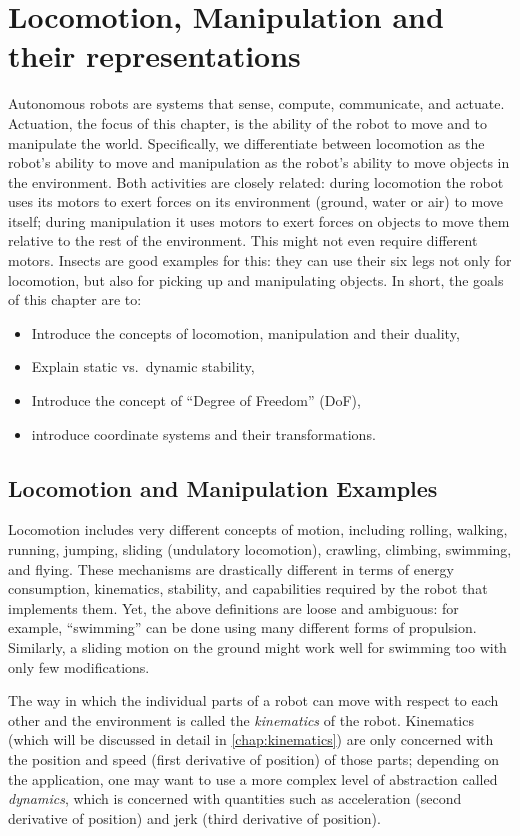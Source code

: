 \chapter{Locomotion, Manipulation and their representations}\label{chap:locomotion}

Autonomous robots are systems that sense, compute, communicate, and actuate. Actuation, the focus of this chapter, is the ability of the robot to move and to manipulate the world. Specifically, we differentiate between locomotion as the robot's ability to move and manipulation as the robot's ability to move objects in the environment. Both activities are closely related: during locomotion the robot uses its motors to exert forces on its environment (ground, water or air) to move itself; during manipulation it uses motors to exert forces on objects to move them relative to the rest of the environment. This might not even require different motors. Insects are good examples for this: they can use their six legs not only for locomotion, but also for picking up and manipulating objects. In short, the goals of this chapter are to:
\begin{itemize}
\item Introduce the concepts of locomotion, manipulation and their duality,
\item Explain static vs.\ dynamic stability,
\item Introduce the concept of ``Degree of Freedom'' (DoF),
\item introduce coordinate systems and their transformations.
\end{itemize}

\section{Locomotion and Manipulation Examples}

Locomotion includes very different concepts of motion, including rolling, walking, running, jumping, sliding (undulatory locomotion), crawling, climbing, swimming, and flying. These mechanisms are drastically different in terms of energy consumption, kinematics, stability, and capabilities required by the robot that implements them. Yet, the above definitions are loose and ambiguous: for example, ``swimming'' can be done using many different forms of propulsion. Similarly, a sliding motion on the ground might work well for swimming too with only few modifications.

The way in which the individual parts of a robot can move with respect to each other and the environment is called the \textsl{kinematics} of the robot. Kinematics (which will be discussed in detail in \cref{chap:kinematics}) are only concerned with the position and speed (first derivative of position) of those parts; depending on the application, one may want to use a more complex level of abstraction called \textsl{dynamics}, which is concerned with quantities such as acceleration (second derivative of position) and jerk (third derivative of position).

